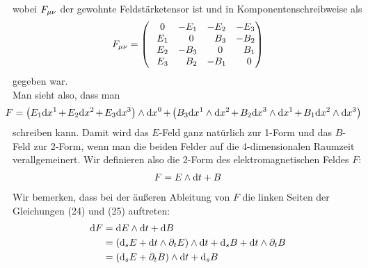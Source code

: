wobei $F_{\mu \nu}$ der gewohnte Feldstärketensor ist und in Komponentenschreibweise als 
\begin{align}
F_{\mu \nu} =
\begin{pmatrix}
\phantom{-}0 & -E_1 & -E_2 & -E_3 \\
\phantom{-}E_1 & \phantom{-}0 & \phantom{-}B_3 & -B_2 \\
\phantom{-}E_2 & -B_3 & \phantom{-}0 & \phantom{-}B_1 \\
\phantom{-}E_3 & \phantom{-}B_2 & -B_1 & \phantom{-}0
\end{pmatrix}
\end{align}
gegeben war. \\
Man sieht also, dass man
\begin{align}
\hspace{-3mm}F = \left( E_1 \dd x^1 \hspace{-0.3mm}+\hspace{-0.3mm}E_2 \dd x^2\hspace{-0.3mm}+\hspace{-0.3mm} E_3 \dd x^3 \right) \w \dd x^0 \hspace{-0.3mm}+\hspace{-0.3mm} \left( B_3 \dd x^1 \w \dd x^2 \hspace{-0.3mm}+\hspace{-0.3mm} B_2 \dd x^3 \w \dd x^1 \hspace{-0.3mm}+\hspace{-0.3mm} B_1 \dd x^2 \w \dd x^3 \right)
\end{align}
schreiben kann. Damit wird das $E$-Feld ganz natürlich zur 1-Form und das $B$-Feld zur 2-Form, wenn man die beiden Felder auf die 4-dimensionalen Raumzeit verallgemeinert. 
Wir definieren also die 2-Form des elektromagnetischen Feldes $F$:
\begin{align}  
F= E \wedge \dd t + B 
\end{align} 
Wir bemerken, dass bei der äußeren Ableitung von $F$ die linken Seiten der Gleichungen (24) und (25) auftreten:
\begin{align}
\dd F &= \dd E \wedge \dd t + \dd B \notag \\
		&= (\dd_s E + \dd t \wedge \partial_t E ) \wedge \dd t + \dd_s B + \dd t \wedge \partial_t B \notag \\
		&= (\dd_s E + \partial_t B) \wedge \dd t + \dd_s B
\end{align}

